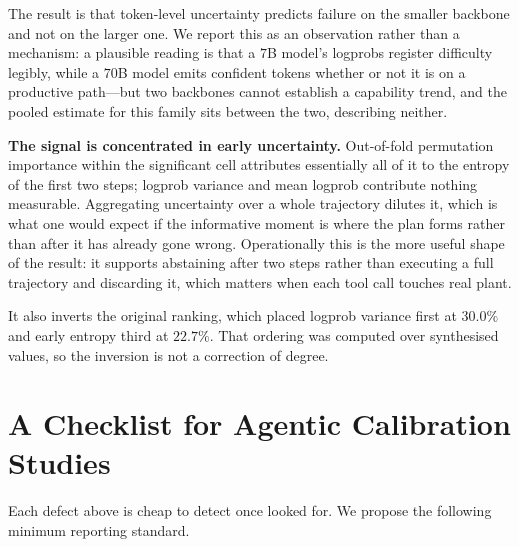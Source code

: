 \documentclass[conference]{IEEEtran}
\begin{document}
The result is that token-level uncertainty predicts failure on the smaller
backbone and not on the larger one. We report this as an observation rather than
a mechanism: a plausible reading is that a $7$B model's logprobs register
difficulty legibly, while a $70$B model emits confident tokens whether or not it
is on a productive path---but two backbones cannot establish a capability trend,
and the pooled estimate for this family sits between the two, describing
neither.

\textbf{The signal is concentrated in early uncertainty.} Out-of-fold permutation
importance within the significant cell attributes essentially all of it to the
entropy of the first two steps; logprob variance and mean logprob contribute
nothing measurable. Aggregating uncertainty over a whole trajectory dilutes it,
which is what one would expect if the informative moment is where the plan forms
rather than after it has already gone wrong. Operationally this is the more
useful shape of the result: it supports abstaining after two steps rather than
executing a full trajectory and discarding it, which matters when each tool call
touches real plant.

It also inverts the original ranking, which placed logprob variance first at
$30.0\%$ and early entropy third at $22.7\%$. That ordering was computed over
synthesised values, so the inversion is not a correction of degree.

\section{A Checklist for Agentic Calibration Studies}
\label{sec:checklist}

Each defect above is cheap to detect once looked for. We propose the following
minimum reporting standard.
\end{document}
